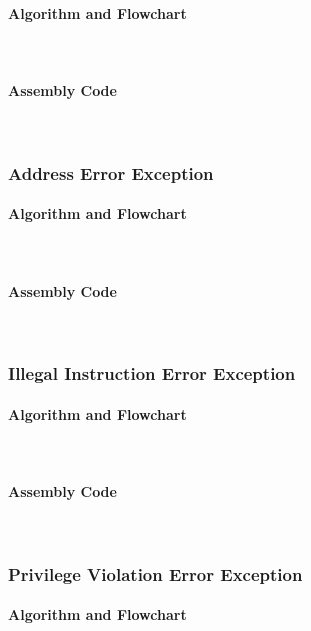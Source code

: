 \documentclass[12pt]{article}
\begin{document}
			\paragraph{Algorithm and Flowchart}~\\
			\paragraph{Assembly Code}~\\				
			
			\subsubsection{Address Error Exception}
			\paragraph{Algorithm and Flowchart}~\\
			\paragraph{Assembly Code}~\\				
			
			\subsubsection{Illegal Instruction Error Exception}
			\paragraph{Algorithm and Flowchart}~\\
			\paragraph{Assembly Code}~\\				
			
			\subsubsection{Privilege Violation Error Exception}
			\paragraph{Algorithm and Flowchart}~\\
\end{document}
